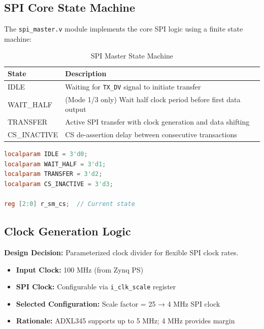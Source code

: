 \documentclass[11pt,a4paper]{article}
\begin{document}
\subsection{SPI Core State Machine}

The \texttt{spi\_master.v} module implements the core SPI logic using a finite state machine:

\begin{table}[H]
\centering
\caption{SPI Master State Machine}
\label{tab:state_machine}
\begin{tabular}{@{}lp{10cm}@{}}
\toprule
\textbf{State} & \textbf{Description} \\ \midrule
IDLE & Waiting for \texttt{TX\_DV} signal to initiate transfer \\
WAIT\_HALF & (Mode 1/3 only) Wait half clock period before first data output \\
TRANSFER & Active SPI transfer with clock generation and data shifting \\
CS\_INACTIVE & CS de-assertion delay between consecutive transactions \\ \bottomrule
\end{tabular}
\end{table}

\begin{lstlisting}[language=Verilog, caption=SPI State Machine Declaration]
localparam IDLE = 3'd0;
localparam WAIT_HALF = 3'd1;
localparam TRANSFER = 3'd2;
localparam CS_INACTIVE = 3'd3;

reg [2:0] r_sm_cs;  // Current state
\end{lstlisting}

\subsection{Clock Generation Logic}

\textbf{Design Decision:} Parameterized clock divider for flexible SPI clock rates.

\begin{itemize}
    \item \textbf{Input Clock:} 100 MHz (from Zynq PS)
    \item \textbf{SPI Clock:} Configurable via \texttt{i\_clk\_scale} register
    \item \textbf{Selected Configuration:} Scale factor = 25 → 4 MHz SPI clock
    \item \textbf{Rationale:} ADXL345 supports up to 5 MHz; 4 MHz provides margin
\end{itemize}
\end{document}
